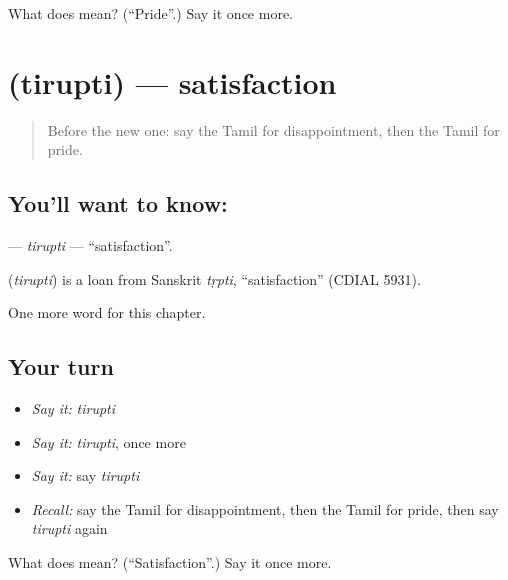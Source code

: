\begin{tcolorbox}[breakable,colback=teal!4,colframe=teal!35!black,title={Before you move on}]
What does  mean? (\textquotedblleft{}Pride\textquotedblright{}.) Say it once more.
\end{tcolorbox}
\section[\texorpdfstring{\ta{திருப்தி} (tirupti)}{திருப்தி (tirupti)}]{ (tirupti) — satisfaction}

\label{lesson:TA-C239-tirupti}



\begin{quote}
Before the new one: say the Tamil for disappointment, then the Tamil for pride.
\end{quote}

\subsection*{You'll want to know: }
\textbf{} — \emph{tirupti} — \textquotedblleft{}satisfaction\textquotedblright{}.

\begin{cousinweb}
\textbf{} (\emph{tirupti}) is a loan from Sanskrit \emph{tṛpti}, \textquotedblleft{}satisfaction\textquotedblright{} (CDIAL 5931).
\end{cousinweb}

\begin{grammarlens}[title={What you've built}]
One more word for this chapter.
\end{grammarlens}

\subsection*{Your turn}
\begin{itemize}
\raggedright
  \item \emph{Say it:} \emph{tirupti}
  \item \emph{Say it:} \emph{tirupti}, once more
  \item \emph{Say it:} say \emph{tirupti}
  \item \emph{Recall:} say the Tamil for disappointment, then the Tamil for pride, then say \emph{tirupti} again
\end{itemize}

\begin{tcolorbox}[breakable,colback=teal!4,colframe=teal!35!black,title={Before you move on}]
What does  mean? (\textquotedblleft{}Satisfaction\textquotedblright{}.) Say it once more.
\end{tcolorbox}

